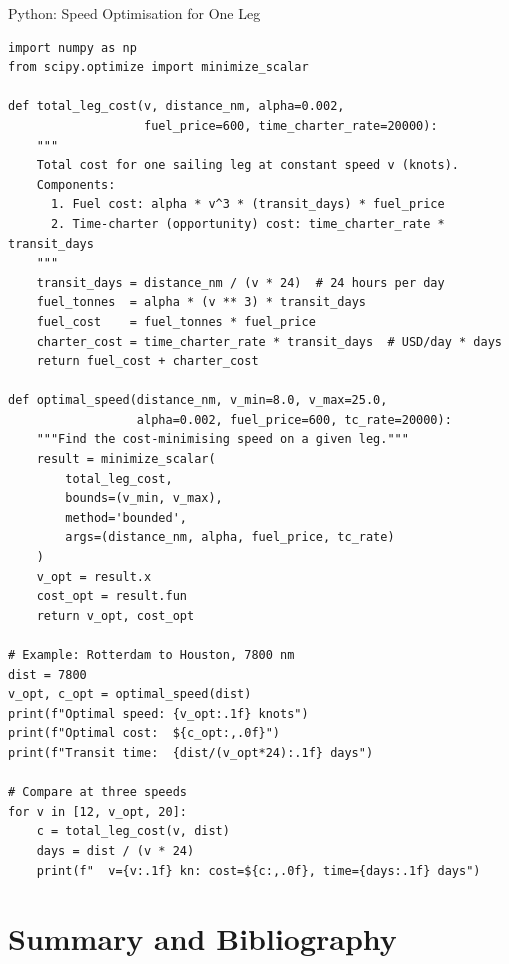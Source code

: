 \documentclass[aspectratio=169,10pt]{beamer}
\begin{document}
\begin{frame}[fragile]{Python: Speed Optimisation for One Leg}
\begin{lstlisting}[caption={Finding the cost-optimal speed on a single leg, balancing
                             cubic fuel cost against time-charter (daily) cost.}]
import numpy as np
from scipy.optimize import minimize_scalar

def total_leg_cost(v, distance_nm, alpha=0.002,
                   fuel_price=600, time_charter_rate=20000):
    """
    Total cost for one sailing leg at constant speed v (knots).
    Components:
      1. Fuel cost: alpha * v^3 * (transit_days) * fuel_price
      2. Time-charter (opportunity) cost: time_charter_rate * transit_days
    """
    transit_days = distance_nm / (v * 24)  # 24 hours per day
    fuel_tonnes  = alpha * (v ** 3) * transit_days
    fuel_cost    = fuel_tonnes * fuel_price
    charter_cost = time_charter_rate * transit_days  # USD/day * days
    return fuel_cost + charter_cost

def optimal_speed(distance_nm, v_min=8.0, v_max=25.0,
                  alpha=0.002, fuel_price=600, tc_rate=20000):
    """Find the cost-minimising speed on a given leg."""
    result = minimize_scalar(
        total_leg_cost,
        bounds=(v_min, v_max),
        method='bounded',
        args=(distance_nm, alpha, fuel_price, tc_rate)
    )
    v_opt = result.x
    cost_opt = result.fun
    return v_opt, cost_opt

# Example: Rotterdam to Houston, 7800 nm
dist = 7800
v_opt, c_opt = optimal_speed(dist)
print(f"Optimal speed: {v_opt:.1f} knots")
print(f"Optimal cost:  ${c_opt:,.0f}")
print(f"Transit time:  {dist/(v_opt*24):.1f} days")

# Compare at three speeds
for v in [12, v_opt, 20]:
    c = total_leg_cost(v, dist)
    days = dist / (v * 24)
    print(f"  v={v:.1f} kn: cost=${c:,.0f}, time={days:.1f} days")
\end{lstlisting}
\end{frame}

\section{Summary and Bibliography}
\end{document}
